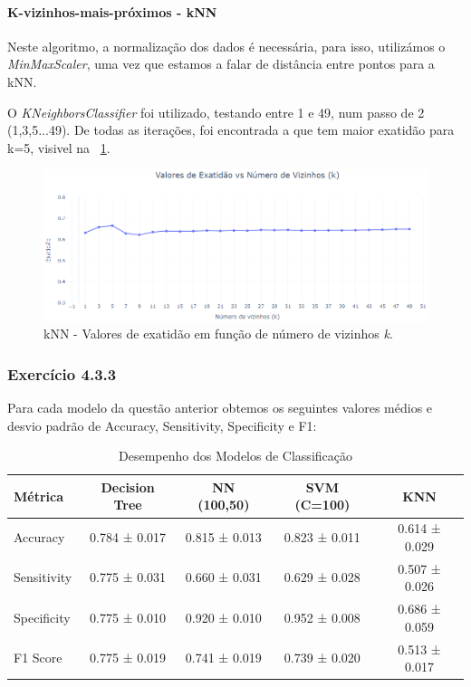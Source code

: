 \documentclass[conference]{IEEEtran}
\begin{document}
\medskip

\paragraph{K-vizinhos-mais-próximos - kNN}

Neste algoritmo, a normalização dos dados é necessária, para isso, utilizámos o \textit{MinMaxScaler}, uma vez que estamos a falar de distância entre pontos para a kNN.

O \textit{KNeighborsClassifier} foi utilizado, testando entre 1 e 49, num passo de 2 (1,3,5...49). De todas as iterações, foi encontrada a que tem maior exatidão para k=5, visivel na \figurename~\ref{fig:kNN_exatidao_vs_k}.


\begin{figure}[h]
	\centering
	\includegraphics[width=0.9\linewidth]{kNN_exatidao_vs_k}
	\caption{kNN - Valores de exatidão em função de número de vizinhos \textit{k}.}
	\label{fig:kNN_exatidao_vs_k}
\end{figure}

\medskip

\subsubsection{\textbf{Exercício 4.3.3}}

Para cada modelo da questão anterior obtemos os seguintes valores médios e desvio padrão de Accuracy, Sensitivity, Specificity e F1:

\begin{table}[h]
	\centering
	\scriptsize
	\caption{Desempenho dos Modelos de Classificação}
	\begin{tabular}{|l|c|c|c|c|}
		\hline
		\textbf{Métrica} & \textbf{Decision Tree} & \textbf{NN (100,50)} & \textbf{SVM (C=100)} & \textbf{KNN} \\
		\hline
		Accuracy    & 0.784 ± 0.017   & 0.815 ± 0.013 & 0.823 ± 0.011 & 0.614 ± 0.029 \\
		Sensitivity & 0.775 ± 0.031   & 0.660 ± 0.031 & 0.629 ± 0.028 & 0.507 ± 0.026 \\
		Specificity & 0.775 ± 0.010   & 0.920 ± 0.010 & 0.952 ± 0.008 & 0.686 ± 0.059 \\
		F1 Score    & 0.775 ± 0.019   & 0.741 ± 0.019 & 0.739 ± 0.020 & 0.513 ± 0.017 \\
		\hline
	\end{tabular}
\end{table}
\end{document}
